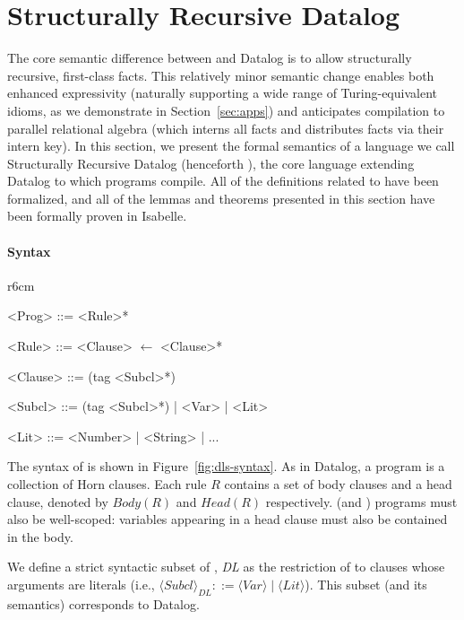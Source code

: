 \section{Structurally Recursive Datalog}
\label{sec:semantics}
%
The core semantic difference between \slog{} and Datalog is to allow
structurally recursive, first-class facts.  This relatively minor
semantic change enables both enhanced expressivity (naturally
supporting a wide range of Turing-equivalent idioms, as we demonstrate
in Section~\ref{sec:apps}) and anticipates compilation to parallel
relational algebra (which interns all facts and distributes facts via
their intern key). In this section, we present the formal semantics of
a language we call Structurally Recursive Datalog (henceforth
\core{}), the core language extending Datalog to which \slog{}
programs compile. All of the definitions related to \core{} have been
formalized, and all of the lemmas and theorems presented in this
section have been formally proven in Isabelle.

\paragraph*{Syntax}
%
\begin{wrapfigure}{r}{6cm}
\vspace{-0.5cm}
\begin{grammar}
  <Prog>   ::= <Rule>*
  
  <Rule>   ::= <Clause> $\leftarrow$ <Clause>*
  
  <Clause> ::= (tag <Subcl>*)
  
  <Subcl>  ::= (tag <Subcl>*) | <Var> | <Lit>
  
  <Lit>    ::= <Number> | <String> | ...
\end{grammar}
\caption{Syntax of \core{}: \textit{tag} is a relation name.}
\label{fig:dls-syntax}
\end{wrapfigure}
%
The syntax of \core{} is shown in Figure~\ref{fig:dls-syntax}. As in
Datalog, a \core{} program is a collection of Horn clauses. Each
rule $R$ contains a set of body clauses and a head clause, denoted by
$\textit{Body}(R)$ and $\textit{Head}(R)$ respectively. \core{} (and
\slog{}) programs must also be well-scoped: variables appearing in a
head clause must also be contained in the body.
  
We define a strict syntactic subset of \core{}, \textit{DL} as the
restriction of \core{} to clauses whose arguments are literals (i.e.,
${\langle\textit{Subcl}\rangle}_{\textit{DL}} ::= \langle\textit{Var}\rangle \mid
\langle\textit{Lit}\rangle$). This subset (and its semantics) corresponds to
Datalog.

